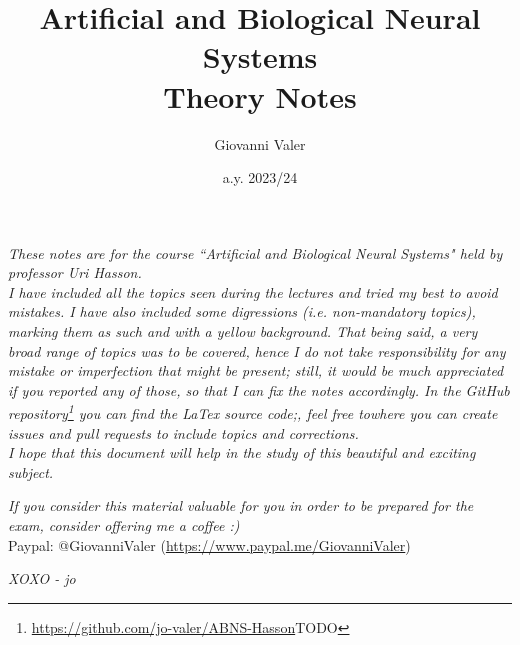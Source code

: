 \documentclass[]{report}
\title{\textbf{Artificial and Biological Neural Systems}\\\large \textbf{Theory Notes}}
\author{Giovanni Valer}
\date{a.y. 2023/24}
\begin{document}
\maketitle
{}

\newpage
{}
\textit{These notes are for the course ``Artificial and Biological Neural Systems" held by professor Uri Hasson.\\
I have included all the topics seen during the lectures and tried my best to avoid mistakes. I have also included some digressions (i.e. non-mandatory topics), marking them as such and with a yellow background. That being said, a very broad range of topics was to be covered, hence I do not take responsibility for any mistake or imperfection that might be present; still, it would be much appreciated if you reported any of those, so that I can fix the notes accordingly.
In the GitHub repository\footnote{\url{https://github.com/jo-valer/ABNS-Hasson}TODO} you can find the LaTex source code;, feel free towhere you can create issues and pull requests to include topics and corrections.\\
I hope that this document will help in the study of this beautiful and exciting subject.}
\newline

\textit{If you consider this material valuable for you in order to be prepared for the exam, consider offering me a coffee :)}\\
Paypal: @GiovanniValer (\url{https://www.paypal.me/GiovanniValer})
\newline

\textit{XOXO - jo}
\restoregeometry
\newpage

\tableofcontents
\clearpage










% 


\end{document}
